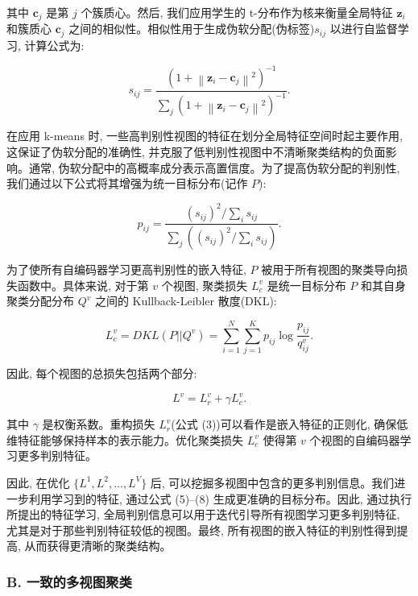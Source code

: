 \documentclass{article}
\begin{document}
其中 $\mathbf{c}_j$ 是第 $j$ 个簇质心。然后, 我们应用学生的 t-分布作为核来衡量全局特征 $\mathbf{z}_i$ 和簇质心 $\mathbf{c}_j$ 之间的相似性。相似性用于生成伪软分配(伪标签)$s_{ij}$ 以进行自监督学习, 计算公式为:

\begin{equation}
    s_{ij} = \frac{(1 + \left\| \mathbf{z}_i - \mathbf{c}_j \right\|^2)^{-1}}{\sum_j (1 + \left\| \mathbf{z}_i - \mathbf{c}_j \right\|^2)^{-1}}.
\end{equation}

在应用 k-means 时, 一些高判别性视图的特征在划分全局特征空间时起主要作用, 这保证了伪软分配的准确性, 并克服了低判别性视图中不清晰聚类结构的负面影响。通常, 伪软分配中的高概率成分表示高置信度。为了提高伪软分配的判别性, 我们通过以下公式将其增强为统一目标分布(记作 $P$):

\begin{equation}
    p_{ij} = \frac{(s_{ij})^2/\sum_i s_{ij}}{\sum_j ((s_{ij})^2/\sum_i s_{ij})}.
\end{equation}

为了使所有自编码器学习更高判别性的嵌入特征, $P$ 被用于所有视图的聚类导向损失函数中。具体来说, 对于第 $v$ 个视图, 聚类损失 $L^v_c$ 是统一目标分布 $P$ 和其自身聚类分配分布 $Q^v$ 之间的 Kullback-Leibler 散度(DKL):

\begin{equation}
    L^v_c = DKL(P || Q^v) = \sum_{i=1}^{N} \sum_{j=1}^{K} p_{ij} \log \frac{p_{ij}}{q^v_{ij}}.
\end{equation}

因此, 每个视图的总损失包括两个部分:

\begin{equation}
    L^v = L^v_r + \gamma L^v_c.
\end{equation}

其中 $\gamma$ 是权衡系数。重构损失 $L^v_r$(公式 (3))可以看作是嵌入特征的正则化, 确保低维特征能够保持样本的表示能力。优化聚类损失 $L^v_c$ 使得第 $v$ 个视图的自编码器学习更多判别特征。

因此, 在优化 $\{L^1, L^2, \ldots, L^V\}$ 后, 可以挖掘多视图中包含的更多判别信息。我们进一步利用学习到的特征, 通过公式 (5)–(8) 生成更准确的目标分布。因此, 通过执行所提出的特征学习, 全局判别信息可以用于迭代引导所有视图学习更多判别特征, 尤其是对于那些判别特征较低的视图。最终, 所有视图的嵌入特征的判别性得到提高, 从而获得更清晰的聚类结构。


\subsubsection*{B. 一致的多视图聚类}
\end{document}
